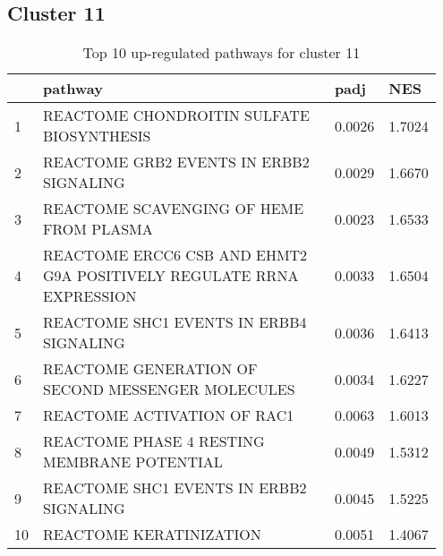 \documentclass{article}
\begin{document}
\subsection{Cluster 11 }
\begin{table}[H]
\centering
\begin{tabular}{p{0.05\linewidth}p{0.7\linewidth}p{0.1\linewidth}p{0.1\linewidth}}
  \hline
 & pathway & padj & NES \\ 
  \hline
1 & REACTOME CHONDROITIN SULFATE BIOSYNTHESIS & 0.0026 & 1.7024 \\ 
  2 & REACTOME GRB2 EVENTS IN ERBB2 SIGNALING & 0.0029 & 1.6670 \\ 
  3 & REACTOME SCAVENGING OF HEME FROM PLASMA & 0.0023 & 1.6533 \\ 
  4 & REACTOME ERCC6 CSB AND EHMT2 G9A POSITIVELY REGULATE RRNA EXPRESSION & 0.0033 & 1.6504 \\ 
  5 & REACTOME SHC1 EVENTS IN ERBB4 SIGNALING & 0.0036 & 1.6413 \\ 
  6 & REACTOME GENERATION OF SECOND MESSENGER MOLECULES & 0.0034 & 1.6227 \\ 
  7 & REACTOME ACTIVATION OF RAC1 & 0.0063 & 1.6013 \\ 
  8 & REACTOME PHASE 4 RESTING MEMBRANE POTENTIAL & 0.0049 & 1.5312 \\ 
  9 & REACTOME SHC1 EVENTS IN ERBB2 SIGNALING & 0.0045 & 1.5225 \\ 
  10 & REACTOME KERATINIZATION & 0.0051 & 1.4067 \\ 
   \hline
\end{tabular}
\caption{Top 10 up-regulated pathways for cluster 11} 
\label{tab:q3_2_11}
\end{table}
\end{document}
